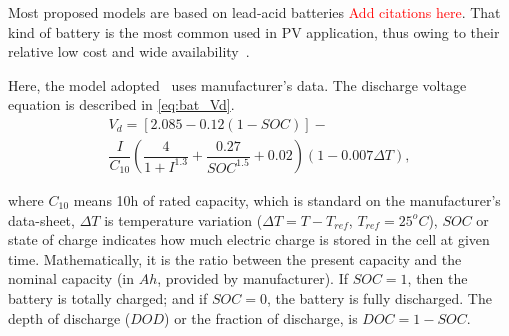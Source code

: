 \documentclass[journal]{IEEEtran}
\begin{document}
%
%
%
%
Most proposed models are based on lead-acid batteries \textcolor{red}{Add citations here}. That kind of battery is the most common used in PV application, thus owing to their relative low cost and wide availability~\cite{Copetti}. 

Here, the model adopted~\cite{Copetti} uses manufacturer's data. %
%
The discharge voltage equation is described in \eqref{eq:bat_Vd}. 
%
\begin{multline}
\label{eq:bat_Vd}
V_{d} = \left[ 2.085-0.12(1-SOC) \right] - \\ \dfrac{I}{C_{10}} \left( \dfrac{4}{1+I^{1.3}} + \dfrac{0.27}{SOC^{1.5}}+0.02 \right) (1-0.007 \Delta T),
\end{multline}

\noindent where $C_{10}$ means 10h of rated capacity, which is standard on the manufacturer's data-sheet, $\Delta T$ is temperature variation ($\Delta T=T-T_{ref} $, $ T_{ref}=25^{o}C $), $ SOC $ or state of charge indicates how much electric charge is stored in the cell at given time. Mathematically, it is the ratio between the present capacity and the nominal capacity (in $ Ah $, provided by manufacturer). If $SOC=1$, then the battery is totally charged; and if $ SOC=0 $, the battery is fully discharged.  %
%
%
The depth of discharge ($DOD$) or the fraction of discharge, is $DOC=1-SOC$.
\end{document}
